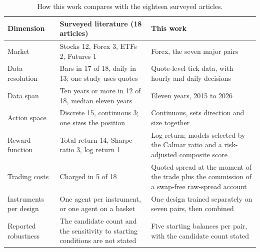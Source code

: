 \begin{table}[htb!]
\centering
\footnotesize
\caption{How this work compares with the eighteen surveyed articles.}
\label{Tables:Positioning}
\begin{tabularx}{\textwidth}{@{}lXX@{}}
\toprule
\textbf{Dimension} & \textbf{Surveyed literature (18 articles)} & \textbf{This work} \\
\midrule
Market & Stocks 12, Forex 3, ETFs 2, Futures 1 & Forex, the seven major pairs \\
\addlinespace
Data resolution & Bars in 17 of 18, daily in 13; one study uses quotes & Quote-level tick data, with hourly and daily decisions \\
\addlinespace
Data span & Ten years or more in 12 of 18, median eleven years & Eleven years, 2015 to 2026 \\
\addlinespace
Action space & Discrete 15, continuous 3; one sizes the position & Continuous, sets direction and size together \\
\addlinespace
Reward function & Total return 14, Sharpe ratio 3, log return 1 & Log return; models selected by the Calmar ratio and a risk-adjusted composite score \\
\addlinespace
Trading costs & Charged in 5 of 18 & Quoted spread at the moment of the trade plus the commission of a swap-free raw-spread account \\
\addlinespace
Instruments per design & One agent per instrument, or one agent on a basket & One design trained separately on seven pairs, then combined \\
\addlinespace
Reported robustness & The candidate count and the sensitivity to starting conditions are not stated & Five starting balances per pair, with the candidate count stated \\
\bottomrule
\end{tabularx}
\end{table}